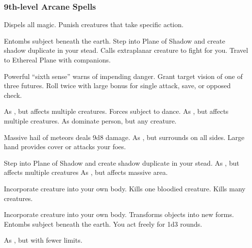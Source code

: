 \subsubsection{9th-level Arcane Spells} 
\begin{swspelllist}
    \spellhead[Abjur]{}
   Dispels all magic.
   Punish creatures that take specific action.

   Entombs subject beneath the earth.
   Step into Plane of Shadow and create shadow duplicate in your stead.
   Calls extraplanar creature to fight for you.
   Travel to Ethereal Plane with companions.

   Powerful ``sixth sense'' warns of impending danger.
   Grant target vision of one of three futures.
   Roll twice with large bonus for single attack, save, or opposed check.

   As , but affects multiple creatures.
   Forces subject to dance.
   As , but affects multiple creatures.
   As dominate person, but any creature.

   Massive hail of meteors deals 9d8 damage.
   As , but surrounds on all sides.
   Large hand provides cover or attacks your foes.

   Step into Plane of Shadow and create shadow duplicate in your stead.
   As , but affects multiple creatures
   As , but affects massive area.

   Incorporate creature into your own body.
   Kills one bloodied creature.
   Kills many creatures.

   Incorporate creature into your own body.
   Transforms objects into new forms.
   Entombs subject beneath the earth.
   You act freely for 1d3 rounds.

  \M As , but with fewer limits.
\end{swspelllist}

